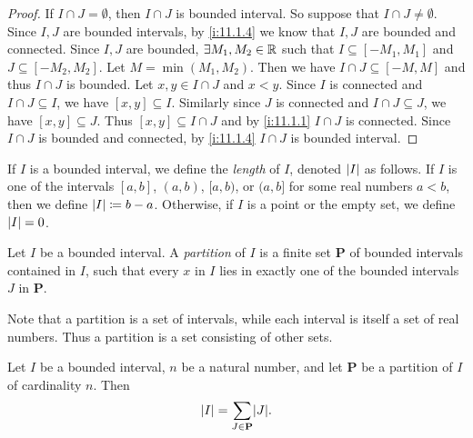 \begin{proof}
  If \(I \cap J = \emptyset\), then \(I \cap J\) is bounded interval.
  So suppose that \(I \cap J \neq \emptyset\).
  Since \(I, J\) are bounded intervals, by \cref{i:11.1.4} we know that \(I, J\) are bounded and connected.
  Since \(I, J\) are bounded, \(\exists M_1, M_2 \in \mathbb{R}\) such that \(I \subseteq [-M_1, M_1]\) and \(J \subseteq [-M_2, M_2]\).
  Let \(M = \min(M_1, M_2)\).
  Then we have \(I \cap J \subseteq [-M, M]\) and thus \(I \cap J\) is bounded.
  Let \(x, y \in I \cap J\) and \(x < y\).
  Since \(I\) is connected and \(I \cap J \subseteq I\), we have \([x, y] \subseteq I\).
  Similarly since \(J\) is connected and \(I \cap J \subseteq J\), we have \([x, y] \subseteq J\).
  Thus \([x, y] \subseteq I \cap J\) and by \cref{i:11.1.1} \(I \cap J\) is connected.
  Since \(I \cap J\) is bounded and connected, by \cref{i:11.1.4} \(I \cap J\) is bounded interval.
\end{proof}

\setcounter{thm}{7}
\begin{defn}\label{i:11.1.8}
  If \(I\) is a bounded interval, we define the \emph{length} of \(I\), denoted \(\left\lvert I\right\rvert\) as follows.
  If \(I\) is one of the intervals \([a, b]\), \((a, b)\), \([a, b)\), or \((a, b]\) for some real numbers \(a < b\), then we define \(\left\lvert I\right\rvert \coloneqq b - a\).
  Otherwise, if \(I\) is a point or the empty set, we define \(\left\lvert I\right\rvert = 0\).
\end{defn}

\setcounter{thm}{9}
\begin{defn}[Partitions]\label{i:11.1.10}
  Let \(I\) be a bounded interval.
  A \emph{partition} of \(I\) is a finite set \(\mathbf{P}\) of bounded intervals contained in \(I\), such that every \(x\) in \(I\) lies in exactly one of the bounded intervals \(J\) in \(\mathbf{P}\).
\end{defn}

\begin{rmk}\label{i:11.1.11}
  Note that a partition is a set of intervals, while each interval is itself a set of real numbers.
  Thus a partition is a set consisting of other sets.
\end{rmk}

\setcounter{thm}{12}
\begin{thm}\label{i:11.1.13}
  Let \(I\) be a bounded interval, \(n\) be a natural number, and let \(\mathbf{P}\) be a partition of \(I\) of cardinality \(n\).
  Then
  \[
    \abs{I} = \sum_{J \in \mathbf{P}} \abs{J}.
  \]
\end{thm}

